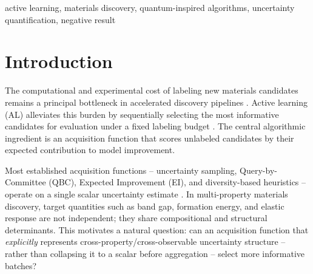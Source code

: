 \documentclass[conference]{IEEEtran}
\begin{document}
\begin{abstract}
robustly. Separately, we build and verify an actual quantum circuit realization of the formalism (amplitude encoding plus Pauli-decomposed measurement) and confirm it reproduces the classical closed-form exactly; we then characterize its NISQ resource cost -- 528 Pauli measurement terms per variance/covariance quantity, combinatorial growth with the number of observables, and shot/noise sensitivity of the resulting acquisition ranking -- and show that standard qubit-wise-commuting measurement grouping provides a genuine 4.3$\times$ reduction in that cost (12.3$\times$ with full commuting grouping, at added circuit-depth cost), with sparse-by-construction observables providing a further 2.4--3.7$\times$ reduction at the cost of a small, statistically significant accuracy drop traced to the same source: sparse, non-overlapping observables have exactly zero covariance between them. This is an honest feasibility study, not a performance claim.
\end{abstract}

\begin{IEEEkeywords}
active learning, materials discovery, quantum-inspired algorithms, uncertainty quantification, negative result
\end{IEEEkeywords}

\section{Introduction}

The computational and experimental cost of labeling new materials candidates remains a principal bottleneck in accelerated discovery pipelines \cite{wang2023scientific,ren2018accelerated,pyzerknapp2022accelerating}. Active learning (AL) alleviates this burden by sequentially selecting the most informative candidates for evaluation under a fixed labeling budget \cite{settles2009active,cohn1996active}. The central algorithmic ingredient is an acquisition function that scores unlabeled candidates by their expected contribution to model improvement.

Most established acquisition functions -- uncertainty sampling, Query-by-Committee (QBC), Expected Improvement (EI), and diversity-based heuristics -- operate on a single scalar uncertainty estimate \cite{settles2012active,sener2018active,ash2020deep}. In multi-property materials discovery, target quantities such as band gap, formation energy, and elastic response are not independent; they share compositional and structural determinants. This motivates a natural question: can an acquisition function that \emph{explicitly} represents cross-property/cross-observable uncertainty structure -- rather than collapsing it to a scalar before aggregation -- select more informative batches?
\end{document}
